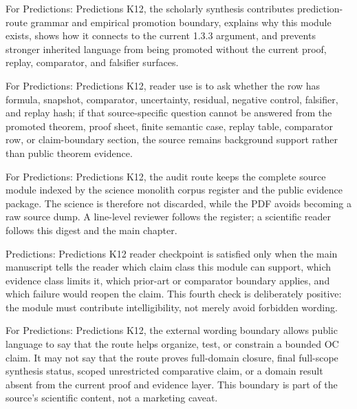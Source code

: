 For Predictions: Predictions K12, the scholarly synthesis contributes prediction-route grammar and empirical promotion boundary, explains why this module exists, shows how it connects to the current 1.3.3 argument, and prevents stronger inherited language from being promoted without the current proof, replay, comparator, and falsifier surfaces.


For Predictions: Predictions K12, reader use is to ask whether the row has formula, snapshot, comparator, uncertainty, residual, negative control, falsifier, and replay hash; if that source-specific question cannot be answered from the promoted theorem, proof sheet, finite semantic case, replay table, comparator row, or claim-boundary section, the source remains background support rather than public theorem evidence.


For Predictions: Predictions K12, the audit route keeps the complete source module indexed by the science monolith corpus register and the public evidence package. The science is therefore not discarded, while the PDF avoids becoming a raw source dump. A line-level reviewer follows the register; a scientific reader follows this digest and the main chapter.


Predictions: Predictions K12 reader checkpoint is satisfied only when the main manuscript tells the reader which claim class this module can support, which evidence class limits it, which prior-art or comparator boundary applies, and which failure would reopen the claim. This fourth check is deliberately positive: the module must contribute intelligibility, not merely avoid forbidden wording.


For Predictions: Predictions K12, the external wording boundary allows public language to say that the route helps organize, test, or constrain a bounded OC claim. It may not say that the route proves full-domain closure, final full-scope synthesis status, scoped unrestricted comparative claim, or a domain result absent from the current proof and evidence layer. This boundary is part of the source's scientific content, not a marketing caveat.
